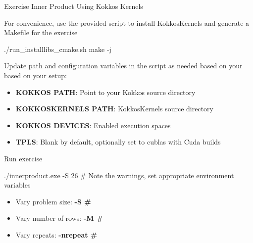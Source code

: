 \begin{frame}[fragile]{Exercise Inner Product Using Kokkos Kernels}

  For convenience, use the provided script to install KokkosKernels and generate a Makefile for the exercise

  \begin{code}
    ./run_installlibs_cmake.sh
    make -j
  \end{code}

  Update path and configuration variables in the script as needed based on your based on your setup:

  \begin{scriptsize}
  \begin{itemize}
    \item \textbf{KOKKOS PATH}: Point to your Kokkos source directory
    \item \textbf{KOKKOSKERNELS PATH}: KokkosKernels source directory
    \item \textbf{KOKKOS DEVICES}: Enabled execution spaces
    \item \textbf{TPLS}: Blank by default, optionally set to cublas with Cuda builds
  \end{itemize}
  \end{scriptsize}

  Run exercise

  \begin{code}
    ./innerproduct.exe -S 26
    # Note the warnings, set appropriate environment variables
  \end{code}

  \begin{scriptsize}
  \begin{itemize}
  \item Vary problem size: \textbf{-S \#}
  \item Vary number of rows: \textbf{-M \#}
  \item Vary repeats: \textbf{-nrepeat \#}
  \end{itemize}
  \end{scriptsize}


\end{frame}




